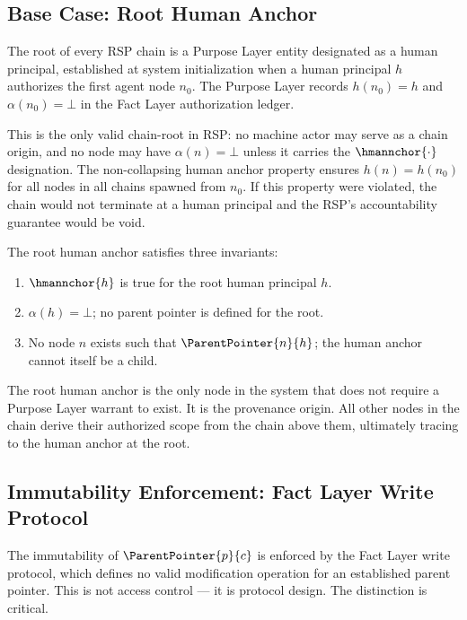 \subsection{Base Case: Root Human Anchor}
\label{sec:root-human-anchor}

The root of every RSP chain is a Purpose Layer entity designated as a human principal, established at system initialization when a human principal $h$ authorizes the first agent node $n_0$. The Purpose Layer records $h(n_0) = h$ and $\alpha(n_0) = \bot$ in the Fact Layer authorization ledger.

This is the only valid chain-root in RSP: no machine actor may serve as a chain origin, and no node may have $\alpha(n) = \bot$ unless it carries the $\hmannchor{\cdot}$ designation. The non-collapsing human anchor property ensures $h(n) = h(n_0)$ for all nodes in all chains spawned from $n_0$. If this property were violated, the chain would not terminate at a human principal and the RSP's accountability guarantee would be void.

The root human anchor satisfies three invariants:

\begin{enumerate}
    \item[(HA1) \textbf{Designation}] $\hmannchor{h}$ is true for the root human principal $h$.
    \item[(HA2) \textbf{Null parent}] $\alpha(h) = \bot$; no parent pointer is defined for the root.
    \item[(HA3) \textbf{Non-subordinability}] No node $n$ exists such that $\ParentPointer{n}{h}$; the human anchor cannot itself be a child.
\end{enumerate}

The root human anchor is the only node in the system that does not require a Purpose Layer warrant to exist. It is the provenance origin. All other nodes in the chain derive their authorized scope from the chain above them, ultimately tracing to the human anchor at the root.

\subsection{Immutability Enforcement: Fact Layer Write Protocol}
\label{sec:fact-layer-immutability}

The immutability of $\ParentPointer{p}{c}$ is enforced by the Fact Layer write protocol, which defines no valid modification operation for an established parent pointer. This is not access control --- it is protocol design. The distinction is critical.

